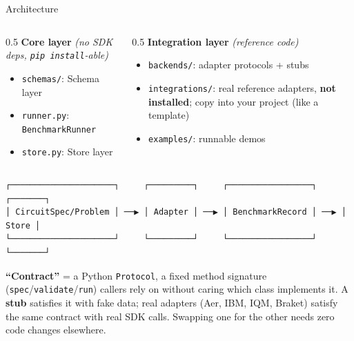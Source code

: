 \documentclass[
  ignorenonframetext,
  aspectratio=169,
]{beamer}
\providecommand{\tightlist}{%
  \setlength{\itemsep}{0pt}\setlength{\parskip}{0pt}}
\begin{document}
\begin{frame}[fragile]{Architecture}
\label{architecture}
\footnotesize

\begin{columns}[T]
\begin{column}{0.5\textwidth}
\textbf{Core layer} \emph{(no SDK deps, \texttt{pip\ install}-able)}

\begin{itemize}
\tightlist
\item
  \texttt{schemas/}: Schema layer
\item
  \texttt{runner.py}: \texttt{BenchmarkRunner}
\item
  \texttt{store.py}: Store layer
\end{itemize}
\end{column}

\begin{column}{0.5\textwidth}
\textbf{Integration layer} \emph{(reference code)}

\begin{itemize}
\tightlist
\item
  \texttt{backends/}: adapter protocols + stubs
\item
  \texttt{integrations/}: real reference adapters, \textbf{not
  installed}; copy into your project (like a template)
\item
  \texttt{examples/}: runnable demos
\end{itemize}
\end{column}
\end{columns}

\normalsize

\begin{verbatim}
┌─────────────────────┐     ┌─────────┐     ┌─────────────────┐     ┌───────┐
│ CircuitSpec/Problem │ ──▶ │ Adapter │ ──▶ │ BenchmarkRecord │ ──▶ │ Store │
└─────────────────────┘     └─────────┘     └─────────────────┘     └───────┘
\end{verbatim}

\footnotesize

\textbf{``Contract''} = a Python \texttt{Protocol}, a fixed method
signature (\texttt{spec}/\texttt{validate}/\texttt{run}) callers rely on
without caring which class implements it. A \textbf{stub} satisfies it
with fake data; real adapters (Aer, IBM, IQM, Braket) satisfy the same
contract with real SDK calls. Swapping one for the other needs zero code
changes elsewhere. \normalsize
\end{frame}
\end{document}

